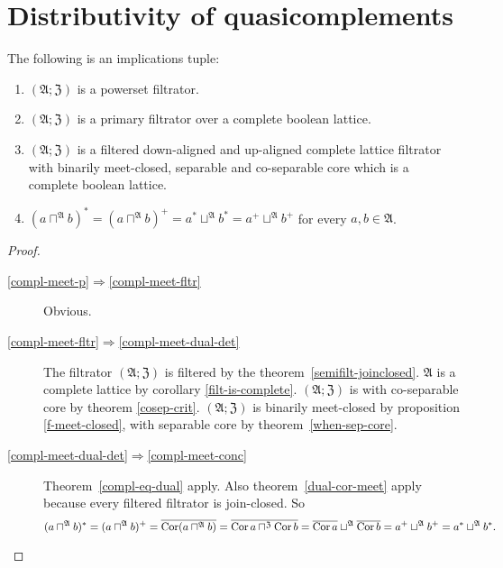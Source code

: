 \section{Distributivity of quasicomplements}
\begin{thm}
\label{f-compl-meet}The following is an implications tuple:
\begin{enumerate}
\item \label{compl-meet-p}$(\mathfrak{A};\mathfrak{Z})$ is a powerset
filtrator.
\item \label{compl-meet-fltr}$(\mathfrak{A};\mathfrak{Z})$ is a primary
filtrator over a complete boolean lattice.
\item \label{compl-meet-dual-det}$(\mathfrak{A};\mathfrak{Z})$ is a filtered down-aligned and up-aligned
complete lattice filtrator with binarily meet-closed, separable and
co-separable core which is a complete boolean lattice.
\item \label{compl-meet-conc}$(a\sqcap^{\mathfrak{A}}b)^{\ast}=(a\sqcap^{\mathfrak{A}}b)^{+}=a^{\ast}\sqcup^{\mathfrak{A}}b^{\ast}=a^{+}\sqcup^{\mathfrak{A}}b^{+}$
for every $a,b\in\mathfrak{A}$.
\end{enumerate}
\end{thm}
\begin{proof}
~
\begin{description}
\item [{\ref{compl-meet-p}$\Rightarrow$\ref{compl-meet-fltr}}] Obvious.

\item [{\ref{compl-meet-fltr}$\Rightarrow$\ref{compl-meet-dual-det}}] The
filtrator $(\mathfrak{A};\mathfrak{Z})$ is filtered by the theorem~\ref{semifilt-joinclosed}.
$\mathfrak{A}$ is a complete lattice by corollary \ref{filt-is-complete}.
$(\mathfrak{A};\mathfrak{Z})$ is with co-separable core by theorem
\ref{cosep-crit}.
$(\mathfrak{A};\mathfrak{Z})$ is
binarily meet-closed by proposition \ref{f-meet-closed}, with separable
core by theorem~\ref{when-sep-core}.


\item [{\ref{compl-meet-dual-det}$\Rightarrow$\ref{compl-meet-conc}}]
Theorem~\ref{compl-eq-dual} apply.
Also theorem~\ref{dual-cor-meet} apply because every filtered filtrator is join-closed.
So
\[
(a\sqcap^{\mathfrak{A}}b)^{\ast}=(a\sqcap^{\mathfrak{A}}b)^{+}=\overline{\operatorname{Cor}(a\sqcap^{\mathfrak{A}}b)}=\overline{\operatorname{Cor} a\sqcap^{\mathfrak{Z}}\operatorname{Cor} b}=\overline{\operatorname{Cor} a}\sqcup^{\mathfrak{A}}\overline{\operatorname{Cor} b}=a^{+}\sqcup^{\mathfrak{A}}b^{+}=a^{\ast}\sqcup^{\mathfrak{A}}b^{\ast}.
\]
\end{description}
\end{proof}

